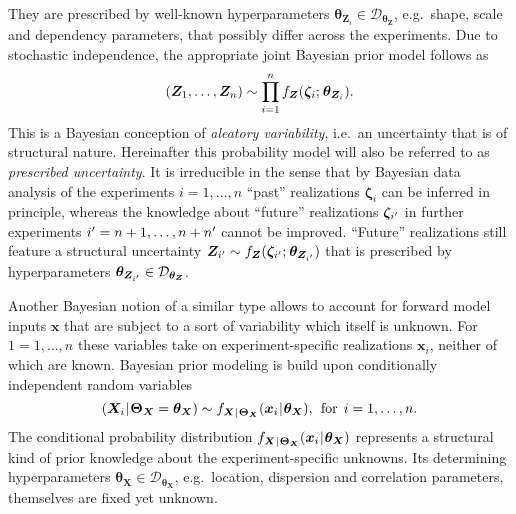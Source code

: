 They are prescribed by well-known hyperparameters \(\bm{\theta}_{\bm{Z}_i} \in \mathcal{D}_{\bm{\theta}_{\bm{Z}}}\), e.g.\ shape, scale and dependency parameters, that possibly differ across the experiments.
Due to stochastic independence, the appropriate joint Bayesian prior model follows as
\begin{equation} \label{eq:PEM:Multilevel:JointStructuralPriorZ}
  (\bm{Z}_1,\ldots,\bm{Z}_n) \sim \prod\limits_{i=1}^n f_{\bm{Z}}(\bm{\zeta}_i ;{\:\!} \bm{\theta}_{\bm{Z}_i}).
\end{equation}
This is a Bayesian conception of \textit{aleatory variability}, i.e.\ an uncertainty that is of structural nature.
Hereinafter this probability model will also be referred to as \textit{prescribed uncertainty}.
It is irreducible in the sense that by Bayesian data analysis of the experiments \(i=1,\ldots,n\) ``past'' realizations \(\bm{\zeta}_i\) can be inferred in principle,
whereas the knowledge about ``future'' realizations \(\bm{\zeta}_{{i}^\prime}\) in further experiments \({i}^\prime = n+1,\ldots,n+{n}^\prime\) cannot be improved.
``Future'' realizations still feature a structural uncertainty \(\bm{Z}_{{i}^\prime} \sim f_{\bm{Z}}(\bm{\zeta}_{{i}^\prime} ;{\:\!} \bm{\theta}_{\bm{Z}_{{i}^\prime}})\)
that is prescribed by hyperparameters \(\bm{\theta}_{\bm{Z}_{{i}^\prime}} \in \mathcal{D}_{\bm{\theta}_{\bm{Z}}}\).
\par %
Another Bayesian notion of a similar type allows to account for forward model inputs \(\bm{x}\) that are subject to a sort of variability which itself is unknown.
For \(1=1,\ldots,n\) these variables take on experiment-specific realizations \(\bm{x}_i\), neither of which are known.
Bayesian prior modeling is build upon conditionally independent random variables
\begin{equation} \label{eq:PEM:Multilevel:StructuralPriorX}
  (\bm{X}_i {\:\!}|{\:\!} \bm{\Theta}_{\bm{X}}=\bm{\theta}_{\bm{X}}) \sim f_{\bm{X} {\:\!}|{\:\!} \bm{\Theta}_{\bm{X}}} (\bm{x}_i {\:\!}|{\:\!} \bm{\theta}_{\bm{X}}), \;\, \text{for} \;\, i=1,\ldots,n.
\end{equation}
The conditional probability distribution \(f_{\bm{X} {\:\!}|{\:\!} \bm{\Theta}_{\bm{X}}} (\bm{x}_i {\:\!}|{\:\!} \bm{\theta}_{\bm{X}})\) represents a structural kind of prior knowledge about the experiment-specific unknowns.
Its determining hyperparameters \(\bm{\theta}_{\bm{X}} \in \mathcal{D}_{\bm{\theta}_{\bm{X}}}\), e.g.\ location, dispersion and correlation parameters, themselves are fixed yet unknown.
